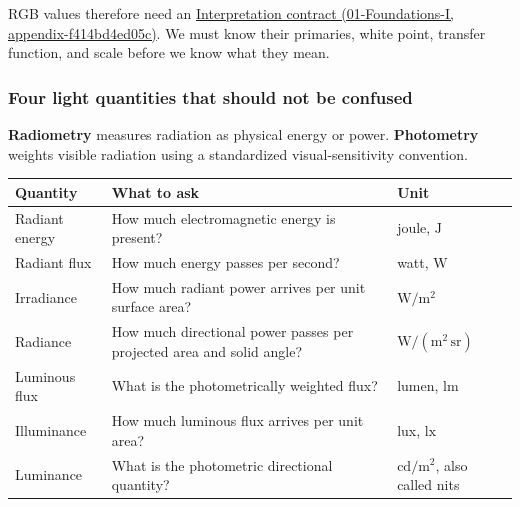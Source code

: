 RGB values therefore need an \href{../01-Foundations-I/main.pdf\#nameddest=appendix-f414bd4ed05c}{Interpretation contract (01-Foundations-I, appendix-f414bd4ed05c)}. We must know their primaries, white point, transfer function, and scale before we know what they mean.

\subsubsection{Four light quantities that should not be confused}\label{04-visual-computing-ii-ch043-four-light-quantities-that-should-not-be-confused}

\textbf{Radiometry} measures radiation as physical energy or power. \textbf{Photometry} weights visible radiation using a standardized visual-sensitivity convention.

{\def\LTcaptype{none} %
\begin{longtable}[]{@{}
  >{\raggedright\arraybackslash}p{}
  >{\raggedright\arraybackslash}p{}
  >{\raggedright\arraybackslash}p{}@{}}
\toprule\noalign{}
\begin{minipage}[b]{\linewidth}\raggedright
Quantity
\end{minipage} & \begin{minipage}[b]{\linewidth}\raggedright
What to ask
\end{minipage} & \begin{minipage}[b]{\linewidth}\raggedright
Unit
\end{minipage} \\
\midrule\noalign{}
\endhead
\bottomrule\noalign{}
\endlastfoot
Radiant energy & How much electromagnetic energy is present? & joule, \(\mathrm{J}\) \\
Radiant flux & How much energy passes per second? & watt, \(\mathrm{W}\) \\
Irradiance & How much radiant power arrives per unit surface area? & \(\mathrm{W/m^2}\) \\
Radiance & How much directional power passes per projected area and solid angle? & \(\mathrm{W/(m^2\,sr)}\) \\
Luminous flux & What is the photometrically weighted flux? & lumen, \(\mathrm{lm}\) \\
Illuminance & How much luminous flux arrives per unit area? & lux, \(\mathrm{lx}\) \\
Luminance & What is the photometric directional quantity? & \(\mathrm{cd/m^2}\), also called nits \\
\end{longtable}
}

